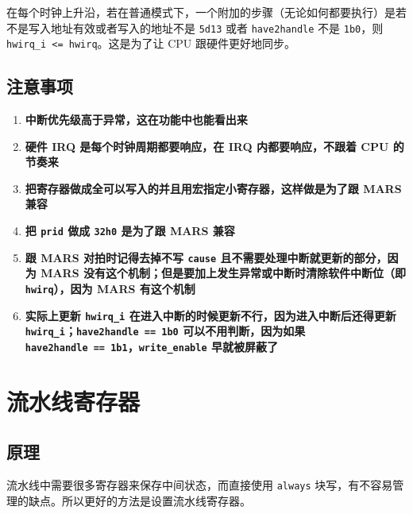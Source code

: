 \documentclass[12pt,AutoFakeBold,AutoFakeSlant]{article}
\providecommand{\tightlist}{%
  \setlength{\itemsep}{0pt}\setlength{\parskip}{0pt}}
\begin{document}
在每个时钟上升沿，若在普通模式下，一个附加的步骤（无论如何都要执行）是若不是写入地址有效或者写入的地址不是
\texttt{5\textquotesingle{}d13} 或者 \texttt{have2handle} 不是
\texttt{1\textquotesingle{}b0}，则
\texttt{hwirq\_i\ \textless{}=\ hwirq}。这是为了让 CPU
跟硬件更好地同步。

\hypertarget{ux6ce8ux610fux4e8bux9879-8}{%
\subsection{注意事项}\label{ux6ce8ux610fux4e8bux9879-8}}

\begin{enumerate}
\def\labelenumi{\arabic{enumi}.}
\tightlist
\item
  \textbf{中断优先级高于异常，这在功能中也能看出来}
\item
  \textbf{硬件 IRQ 是每个时钟周期都要响应，在 IRQ 内都要响应，不跟着 CPU
  的节奏来}
\item
  \textbf{把寄存器做成全可以写入的并且用宏指定小寄存器，这样做是为了跟
  MARS 兼容}
\item
  \textbf{把 \texttt{prid} 做成 \texttt{32\textquotesingle{}h0} 是为了跟
  MARS 兼容}
\item
  \textbf{跟 MARS 对拍时记得去掉不写 \texttt{cause}
  且不需要处理中断就更新的部分，因为 MARS
  没有这个机制；但是要加上发生异常或中断时清除软件中断位（即
  \texttt{hwirq}），因为 MARS 有这个机制}
\item
  \textbf{实际上更新 \texttt{hwirq\_i}
  在进入中断的时候更新不行，因为进入中断后还得更新
  \texttt{hwirq\_i}；\texttt{have2handle\ ==\ 1\textquotesingle{}b0}
  可以不用判断，因为如果
  \texttt{have2handle\ ==\ 1\textquotesingle{}b1}，\texttt{write\_enable}
  早就被屏蔽了}
\end{enumerate}

\hypertarget{ux6d41ux6c34ux7ebfux5bc4ux5b58ux5668}{%
\section{流水线寄存器}\label{ux6d41ux6c34ux7ebfux5bc4ux5b58ux5668}}

\hypertarget{ux539fux7406-11}{%
\subsection{原理}\label{ux539fux7406-11}}

流水线中需要很多寄存器来保存中间状态，而直接使用 \texttt{always}
块写，有不容易管理的缺点。所以更好的方法是设置流水线寄存器。
\end{document}
